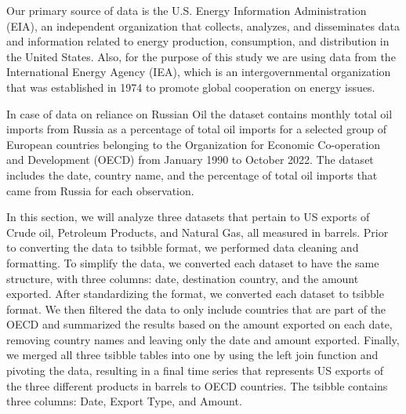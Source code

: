 \documentclass[
]{article}
\begin{document}
Our primary source of data is the U.S. Energy Information Administration
(EIA), an independent organization that collects, analyzes, and
disseminates data and information related to energy production,
consumption, and distribution in the United States. Also, for the
purpose of this study we are using data from the International Energy
Agency (IEA), which is an intergovernmental organization that was
established in 1974 to promote global cooperation on energy issues.

In case of data on reliance on Russian Oil the dataset contains monthly
total oil imports from Russia as a percentage of total oil imports for a
selected group of European countries belonging to the Organization for
Economic Co-operation and Development (OECD) from January 1990 to
October 2022. The dataset includes the date, country name, and the
percentage of total oil imports that came from Russia for each
observation.

In this section, we will analyze three datasets that pertain to US
exports of Crude oil, Petroleum Products, and Natural Gas, all measured
in barrels. Prior to converting the data to tsibble format, we performed
data cleaning and formatting. To simplify the data, we converted each
dataset to have the same structure, with three columns: date,
destination country, and the amount exported. After standardizing the
format, we converted each dataset to tsibble format. We then filtered
the data to only include countries that are part of the OECD and
summarized the results based on the amount exported on each date,
removing country names and leaving only the date and amount exported.
Finally, we merged all three tsibble tables into one by using the left
join function and pivoting the data, resulting in a final time series
that represents US exports of the three different products in barrels to
OECD countries. The tsibble contains three columns: Date, Export Type,
and Amount.
\end{document}

